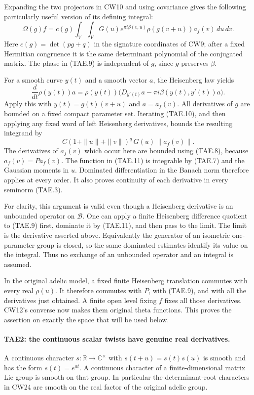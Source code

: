 Expanding the two projectors in CW10 and using covariance gives
the following particularly useful version of its defining integral:
\[
 \Omega(g)f=c(g)\int_V\int_V
   G(u)e^{\pi i\beta(v,u)}
           \rho(g(v+u))a_f(v)\,du\,dv .
 \tag{TAE.9}
\]
Here \(c(g)=\det(p g+q)\) in the signature coordinates of CW9;
after a fixed Hermitian congruence it is the same determinant
polynomial of the conjugated matrix.  The phase in (TAE.9) is
independent of \(g\), since \(g\) preserves \(\beta\).

For a smooth curve \(y(t)\) and a smooth vector \(a\), the
Heisenberg law yields
\[
 \frac{d}{dt}\rho(y(t))a
 =\rho(y(t))
       \bigl(D_{y'(t)}a-\pi i\beta(y(t),y'(t))a\bigr).
 \tag{TAE.10}
\]
Apply this with \(y(t)=g(t)(v+u)\) and \(a=a_f(v)\).
All derivatives of \(g\) are bounded on a fixed compact parameter
set.  Iterating (TAE.10), and then applying any fixed word of
left Heisenberg derivatives, bounds the resulting integrand by
\[
 C(1+\|u\|+\|v\|)^q\,G(u)\,\|a_f(v)\|.
 \tag{TAE.11}
\]
The derivatives of \(a_f(v)\) which occur here are bounded using
(TAE.8), because \(a_f(v)=Pa_f(v)\).
The function in (TAE.11) is integrable by (TAE.7) and the Gaussian
moments in \(u\).  Dominated differentiation in the Banach norm
therefore applies at every order.  It also proves continuity of
each derivative in every seminorm (TAE.3).

For clarity, this argument is valid even though a Heisenberg
derivative is an unbounded operator on \(\mathcal B\).
One can apply a finite Heisenberg difference quotient to (TAE.9)
first, dominate it by (TAE.11), and then pass to the limit.  The
limit is the derivative asserted above.  Equivalently the
generator of an isometric one-parameter group is closed, so the
same dominated estimates identify its value on the integral.
Thus no exchange of an unbounded operator and an integral is
assumed.

In the original adelic model, a fixed finite Heisenberg
translation commutes with every real \(\rho(u)\).  It therefore
commutes with \(P\), with (TAE.9), and with all the derivatives
just obtained.  A finite open level fixing \(f\) fixes all those
derivatives.  CW12's converse now makes them original theta
functions.  This proves the assertion on exactly the space that
will be used below.

\paragraph{TAE2: the continuous scalar twists have genuine real derivatives.}
\label{claim:TAE2}
A continuous character \(s:\mathbb R\to\mathbb C^\times\) with
\(s(t+u)=s(t)s(u)\) is smooth and has the form
\(s(t)=e^{a t}\).  A continuous character of a finite-dimensional
matrix Lie group is smooth on that group.  In particular the
determinant-root characters in CW24 are smooth on the real
factor of the original adelic group.

